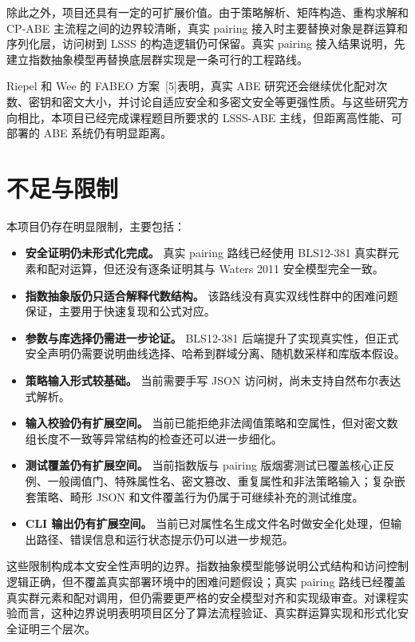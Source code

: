 除此之外，项目还具有一定的可扩展价值。由于策略解析、矩阵构造、重构求解和 CP-ABE 主流程之间的边界较清晰，真实 pairing 接入时主要替换对象是群运算和序列化层，访问树到 LSSS 的构造逻辑仍可保留。真实 pairing 接入结果说明，先建立指数抽象模型再替换底层群实现是一条可行的工程路线。

Riepel 和 Wee 的 FABEO 方案~[5]表明，真实 ABE 研究还会继续优化配对次数、密钥和密文大小，并讨论自适应安全和多密文安全等更强性质。与这些研究方向相比，本项目已经完成课程题目所要求的 LSSS-ABE 主线，但距离高性能、可部署的 ABE 系统仍有明显距离。

\section{不足与限制}

本项目仍存在明显限制，主要包括：

\begin{itemize}
    \item \textbf{安全证明仍未形式化完成。} 真实 pairing 路线已经使用 BLS12-381 真实群元素和配对运算，但还没有逐条证明其与 Waters 2011 安全模型完全一致。
    \item \textbf{指数抽象版仍只适合解释代数结构。} 该路线没有真实双线性群中的困难问题保证，主要用于快速复现和公式对应。
    \item \textbf{参数与库选择仍需进一步论证。} BLS12-381 后端提升了实现真实性，但正式安全声明仍需要说明曲线选择、哈希到群域分离、随机数采样和库版本假设。
    \item \textbf{策略输入形式较基础。} 当前需要手写 JSON 访问树，尚未支持自然布尔表达式解析。
    \item \textbf{输入校验仍有扩展空间。} 当前已能拒绝非法阈值策略和空属性，但对密文数组长度不一致等异常结构的检查还可以进一步细化。
    \item \textbf{测试覆盖仍有扩展空间。} 当前指数版与 pairing 版烟雾测试已覆盖核心正反例、一般阈值门、特殊属性名、密文篡改、重复属性和非法策略输入；复杂嵌套策略、畸形 JSON 和文件覆盖行为仍属于可继续补充的测试维度。
    \item \textbf{CLI 输出仍有扩展空间。} 当前已对属性名生成文件名时做安全化处理，但输出路径、错误信息和运行状态提示仍可以进一步规范。
\end{itemize}

这些限制构成本文安全性声明的边界。指数抽象模型能够说明公式结构和访问控制逻辑正确，但不覆盖真实部署环境中的困难问题假设；真实 pairing 路线已经覆盖真实群元素和配对调用，但仍需要更严格的安全模型对齐和实现级审查。对课程实验而言，这种边界说明表明项目区分了算法流程验证、真实群运算实现和形式化安全证明三个层次。

